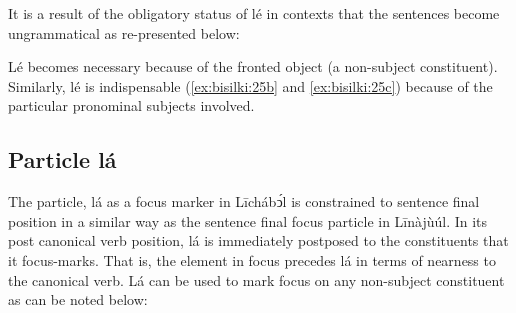 \documentclass[output=paper,colorlinks,citecolor=brown]{langscibook}
\begin{document}
It is a result of the obligatory status of lé in contexts  that the sentences  become ungrammatical as re-presented  below:

\ea%
    \label{ex:bisilki:25}
    \z
\z

Lé  becomes necessary because of the fronted object (a non-subject constituent). Similarly, lé is indispensable (\ref{ex:bisilki:25b} and \ref{ex:bisilki:25c}) because of the particular pronominal subjects involved.

\subsection{Particle lá }\label{sec:bisilki:7.2}

The particle, lá as a focus marker in Līchábͻ́l is constrained to sentence final position in a similar way as the sentence final focus particle in Līnàjùúl. In its post canonical verb position, lá is immediately postposed to the constituents that it focus-marks. That is, the element in focus precedes lá in terms of nearness to the canonical verb. Lá can be used to mark focus on any non-subject constituent as can be noted  below:

\end{document}
